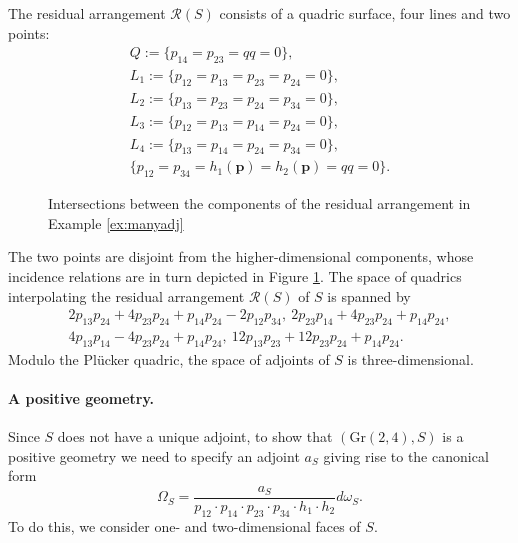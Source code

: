 \documentclass[12pt]{extarticle}
\theoremstyle{definition}
\newenvironment{example}
{\pushQED{\qed}\renewcommand{\qedsymbol}{$\diamond$}\examplex}
{\popQED\endexamplex}
\begin{document}
\begin{example}
    The residual arrangement $\mathcal{R}(S)$ consists of a quadric surface, four lines and two points: 
    \begin{gather*}
        Q:=\{p_{14} = p_{23} = qq = 0\},\\
        L_1:=\{p_{12} = p_{13} = p_{23} = p_{24} = 0\},\\
        L_2:=\{p_{13} = p_{23} = p_{24} = p_{34} = 0\},\\
       L_3:=\{ p_{12} = p_{13} = p_{14} = p_{24} = 0\},\\ 
        L_4:=\{p_{13} = p_{14} = p_{24} = p_{34} = 0\},\\
        \{p_{12} = p_{34} = h_1(\mathbf{p}) = h_2(\mathbf{p}) = qq= 0\}.
    \end{gather*}
\begin{figure}
    \centering
    \caption{Intersections between the components of the residual arrangement in Example \ref{ex:manyadj}}
    \label{fig:ex56}
\end{figure}
    
    The two points are disjoint from the higher-dimensional components, whose incidence relations are in turn depicted in Figure \ref{fig:ex56}.
    The space of quadrics interpolating the residual arrangement $\mathcal{R}(S)$ of $S$ is spanned by 
    \begin{gather*}
    2p_{13}p_{24} + 4p_{23}p_{24} + p_{14}p_{24} - 2p_{12}p_{34},\ 2p_{23}p_{14} + 4p_{23}p_{24} + p_{14}p_{24},\\ 4p_{13}p_{14} - 4p_{23}p_{24} + p_{14}p_{24},\ 12p_{13}p_{23} + 12p_{23}p_{24} + p_{14}p_{24}.
    \end{gather*}
    Modulo the Pl\"ucker quadric, the space of adjoints of $S$ is three-dimensional.

\paragraph{A positive geometry.} Since $S$ does not have a unique adjoint, to show that $(\mathrm{Gr}(2,4),S)$ is a positive geometry we need to specify an adjoint $a_S$ giving rise to the canonical form 
$$\Omega_S=\frac{a_S}{p_{12}\cdot p_{14}\cdot p_{23}\cdot p_{34}\cdot h_1\cdot h_2}d\omega_S.$$
To do this, we consider one- and two-dimensional faces of $S$.


\end{example}
\end{document}
